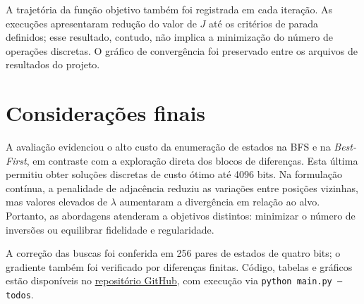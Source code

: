 \documentclass[10pt,a4paper,twocolumn]{article}
\begin{document}
A trajetória da função objetivo também foi registrada em cada iteração. As execuções apresentaram redução do valor de $J$ até os critérios de parada definidos; esse resultado, contudo, não implica a minimização do número de operações discretas. O gráfico de convergência foi preservado entre os arquivos de resultados do projeto.

\section{Considerações finais}
A avaliação evidenciou o alto custo da enumeração de estados na BFS e na \textit{Best-First}, em contraste com a exploração direta dos blocos de diferenças. Esta última permitiu obter soluções discretas de custo ótimo até 4096 bits. Na formulação contínua, a penalidade de adjacência reduziu as variações entre posições vizinhas, mas valores elevados de $\lambda$ aumentaram a divergência em relação ao alvo. Portanto, as abordagens atenderam a objetivos distintos: minimizar o número de inversões ou equilibrar fidelidade e regularidade.

A correção das buscas foi conferida em 256 pares de estados de quatro bits; o gradiente também foi verificado por diferenças finitas. Código, tabelas e gráficos estão disponíveis no \href{https://github.com/LuanDinizMR/mini-projeto-buscas-otimizacao-IA-0}{repositório GitHub}, com execução via \texttt{python main.py --todos}.
\end{document}
